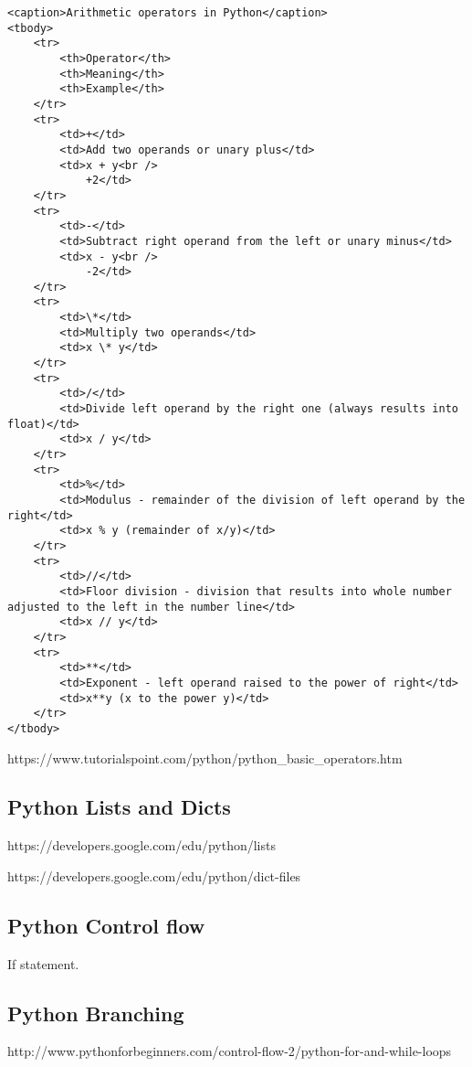 \documentclass[11pt]{article}
\begin{document}
    \begin{verbatim}
<caption>Arithmetic operators in Python</caption>
<tbody>
    <tr>
        <th>Operator</th>
        <th>Meaning</th>
        <th>Example</th>
    </tr>
    <tr>
        <td>+</td>
        <td>Add two operands or unary plus</td>
        <td>x + y<br />
            +2</td>
    </tr>
    <tr>
        <td>-</td>
        <td>Subtract right operand from the left or unary minus</td>
        <td>x - y<br />
            -2</td>
    </tr>
    <tr>
        <td>\*</td>
        <td>Multiply two operands</td>
        <td>x \* y</td>
    </tr>
    <tr>
        <td>/</td>
        <td>Divide left operand by the right one (always results into float)</td>
        <td>x / y</td>
    </tr>
    <tr>
        <td>%</td>
        <td>Modulus - remainder of the division of left operand by the right</td>
        <td>x % y (remainder of x/y)</td>
    </tr>
    <tr>
        <td>//</td>
        <td>Floor division - division that results into whole number adjusted to the left in the number line</td>
        <td>x // y</td>
    </tr>
    <tr>
        <td>**</td>
        <td>Exponent - left operand raised to the power of right</td>
        <td>x**y (x to the power y)</td>
    </tr>
</tbody>
\end{verbatim}

    https://www.tutorialspoint.com/python/python\_basic\_operators.htm

    \subsection{Python Lists and Dicts}\label{python-lists-and-dicts}

    https://developers.google.com/edu/python/lists

    https://developers.google.com/edu/python/dict-files

    \subsection{Python Control flow}\label{python-control-flow}

    If statement.

    \subsection{Python Branching}\label{python-branching}

    http://www.pythonforbeginners.com/control-flow-2/python-for-and-while-loops
\end{document}
